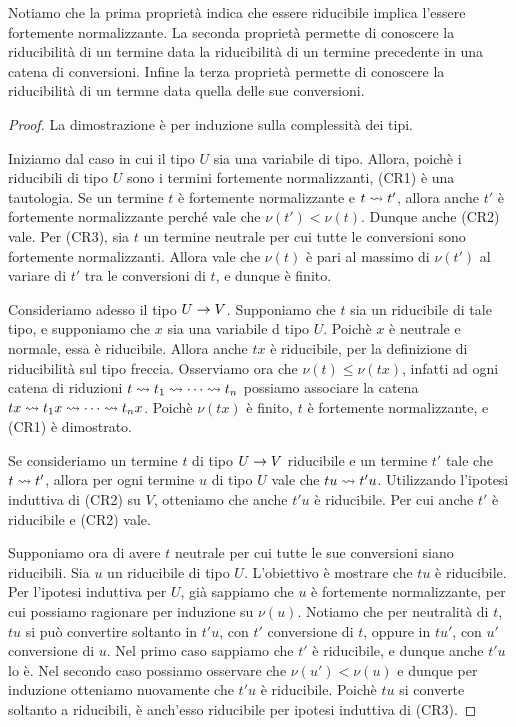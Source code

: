 \documentclass[]{marticle}
\begin{document}
Notiamo che la prima propriet\`a indica che essere riducibile implica l'essere
fortemente normalizzante. La seconda propriet\`a permette di conoscere la
riducibilit\`a di un termine data la riducibilit\`a di un termine precedente in
una catena di conversioni. Infine la terza propriet\`a permette di conoscere la
riducibilit\`a di un termne data quella delle sue conversioni.

\begin{proof}
    La dimostrazione \`e per induzione sulla complessit\`a dei tipi.

    Iniziamo dal caso in cui il tipo $U$ sia una variabile di tipo. Allora,
    poich\`e i riducibili di tipo $U$ sono i termini fortemente normalizzanti,
    (CR1) \`e una tautologia. Se un termine $t$ \`e fortemente normalizzante e
    $t\rightsquigarrow t'$, allora anche $t'$ \`e fortemente normalizzante perch\'e vale
    che $\nu(t')<\nu(t)$. Dunque anche (CR2) vale. Per (CR3), sia $t$ un termine
    neutrale per cui tutte le conversioni sono fortemente normalizzanti. Allora
    vale che $\nu(t)$ \`e pari al massimo di $\nu(t')$ al variare di $t'$ tra le
    conversioni di $t$, e dunque \`e finito.

    Consideriamo adesso il tipo $U\rightarrow V$.  Supponiamo che $t$ sia un riducibile
    di tale tipo, e supponiamo che $x$ sia una variabile d tipo $U$. Poich\`e
    $x$ \`e neutrale e normale, essa \`e riducibile. Allora anche $tx$ \`e
    riducibile, per la definizione di riducibilit\`a sul tipo freccia.
    Osserviamo ora che $\nu(t)\leq \nu(tx)$, infatti ad ogni catena di
    riduzioni $t\rightsquigarrow t_1 \rightsquigarrow\cdots \rightsquigarrow t_n$ possiamo associare la
    catena $tx \rightsquigarrow t_1 x \rightsquigarrow\cdots \rightsquigarrow t_n x$. Poich\`e $\nu(tx)$ \`e
    finito, $t$ \`e fortemente normalizzante, e (CR1) \`e dimostrato.

    Se consideriamo un termine $t$ di tipo $U\rightarrow V$ riducibile e un termine
    $t'$ tale che $t\rightsquigarrow t'$, allora per ogni termine $u$ di tipo $U$ vale che
    $tu\rightsquigarrow t'u$. Utilizzando l'ipotesi induttiva di (CR2) su $V$, otteniamo
    che anche $t'u$ \`e riducibile. Per cui anche $t'$ \`e riducibile e (CR2)
    vale.

    Supponiamo ora di avere $t$ neutrale per cui tutte le sue conversioni siano
    riducibili. Sia $u$ un riducibile di tipo $U$. L'obiettivo \`e mostrare che
    $tu$ \`e riducibile. Per l'ipotesi induttiva per $U$, gi\`a sappiamo che $u$
    \`e fortemente normalizzante, per cui possiamo ragionare per induzione su
    $\nu(u)$. Notiamo che per neutralit\`a di $t$, $tu$ si pu\`o convertire
    soltanto in $t'u$, con $t'$ conversione di $t$, oppure in $tu'$, con $u'$
    conversione di $u$. Nel primo caso sappiamo che $t'$ \`e riducibile, e
    dunque anche $t'u$ lo \`e. Nel secondo caso possiamo osservare che $\nu(u')
    < \nu(u)$ e dunque per induzione otteniamo nuovamente che $t'u$ \`e
    riducibile. Poich\`e $tu$ si converte soltanto a riducibili, \`e anch'esso
    riducibile per ipotesi induttiva di (CR3). 
\end{proof}
\end{document}
